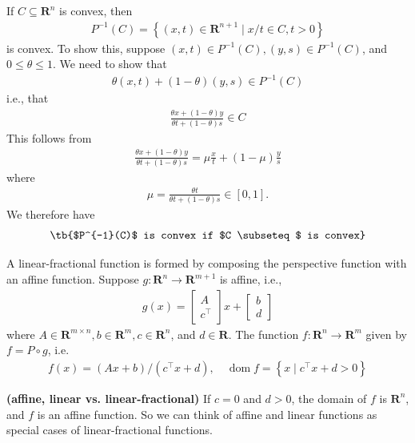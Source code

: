 \documentclass{article}
\newcommand{\bfs}[1]{\textbf{({#1}) }}
\newcommand{\dom}{\operatorname{dom}}
\begin{document}
If $C \subseteq \mathbf{R}^{n}$ is convex, then
\begin{align*}
P^{-1}(C)=\left\{(x, t) \in \mathbf{R}^{n+1} \mid x / t \in C, t>0\right\}
\end{align*}
is convex. To show this, suppose $(x, t) \in P^{-1}(C),(y, s) \in P^{-1}(C)$, and $0 \leq \theta \leq 1$. We need to show that
\begin{align*}
\theta(x, t)+(1-\theta)(y, s) \in P^{-1}(C)
\end{align*}
i.e., that
\begin{align*}
\frac{\theta x+(1-\theta) y}{\theta t+(1-\theta) s} \in C
\end{align*}
This follows from
\begin{align*}
\frac{\theta x+(1-\theta) y}{\theta t+(1-\theta) s}=\mu\frac{x}{t}+(1-\mu)\frac{y}{s}
\end{align*}
where
\begin{align*}
\mu=\frac{\theta t}{\theta t+(1-\theta) s} \in[0,1] .
\end{align*}
We therefore have 
\begin{align}
   \text{\tb{$P^{-1}(C)$ is convex if $C \subseteq$ is convex}}\label{eq:ps_inv}
   \end{align}


A linear-fractional function is formed by composing the perspective function with an affine function. Suppose $g: \mathbf{R}^{n} \rightarrow \mathbf{R}^{m+1}$ is affine, i.e.,
\begin{align*}
g(x)=\left[\begin{array}{c}
A \\
c^{\top}
\end{array}\right] x+\left[\begin{array}{l}
b \\
d
\end{array}\right]
\end{align*}
where $A \in \mathbf{R}^{m \times n}, b \in \mathbf{R}^{m}, c \in \mathbf{R}^{n}$, and $d \in \mathbf{R} .$ The function $f: \mathbf{R}^{n} \rightarrow \mathbf{R}^{m}$ given
by $f=P \circ g$, i.e.
\begin{align*}
f(x)=(A x+b) /\left(c^{\top} x+d\right), \quad \dom  f=\left\{x \mid c^{\top} x+d>0\right\}
\end{align*}

\begin{rema}{\bfs{affine, linear vs. linear-fractional}}
If $c=0$ and $d>0$, the domain
of $f$ is $\mathbf{R}^{n}$, and $f$ is an affine function. So we can think of affine and linear functions as special cases of linear-fractional functions.
\end{rema}
\end{document}
